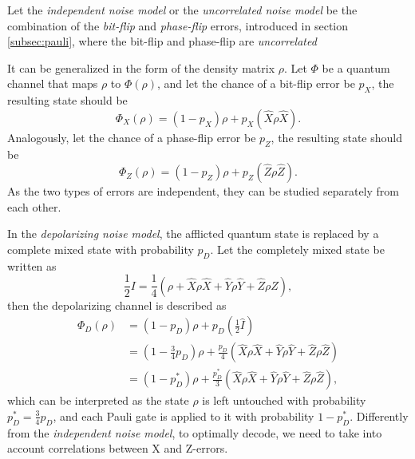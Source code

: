 \begin{definition}\label{def:independent}
  Let the \emph{independent noise model} or the \emph{uncorrelated noise model} be the combination of the \emph{bit-flip} and \emph{phase-flip} errors, introduced in section \ref{subsec:pauli}, where the bit-flip and phase-flip are \emph{uncorrelated}

  It can be generalized in the form of the density matrix $\rho$. Let $\Phi$ be a quantum channel that maps $\rho$ to $\Phi(\rho)$, and let the chance of a bit-flip error be $p_X$, the resulting state should be
  \begin{equation}\label{qec:eq:bitflip}
    \Phi_X(\rho) = (1-p_X)\rho + p_X(\hat{X}\rho \hat{X}).
  \end{equation}
  Analogously, let the chance of a phase-flip error be $p_Z$, the resulting state should be
  \begin{equation}\label{qec:eq:phaseflip}
    \Phi_Z(\rho) = (1-p_Z)\rho + p_Z(\hat{Z}\rho \hat{Z}).
  \end{equation}
  As the two types of errors are independent, they can be studied separately from each other.
\end{definition}

\begin{definition}\label{def:depolarizing}
  In the \emph{depolarizing noise model}, the afflicted quantum state is replaced by a complete mixed state with probability $p_D$. Let the completely mixed state be written as
  \begin{equation}\label{qec:eq:mixstate}
    \frac{1}{2}I = \frac{1}{4}(\rho + \hat{X}\rho \hat{X} + \hat{Y}\rho \hat{Y} + \hat{Z}\rho \hat{Z}),
  \end{equation}
  then the depolarizing channel is described as
  \begin{align}\label{qec:eq:depolarizing}
    \nonumber \Phi_D(\rho) &= (1-p_D)\rho + p_D\left(\frac{1}{2}\hat{I}\right) \\
    \nonumber &= \left(1-\frac{3}{4}p_D\right)\rho + \frac{p_D}{4}(\hat{X}\rho \hat{X} + \hat{Y}\rho \hat{Y} + \hat{Z}\rho \hat{Z}) \\
    &= (1-p^*_D)\rho + \frac{p^*_D}{3}(\hat{X}\rho \hat{X} + \hat{Y}\rho \hat{Y} + \hat{Z}\rho \hat{Z}),
  \end{align}
  which can be interpreted as the state $\rho$ is left untouched with probability $p^*_D =\frac{3}{4}p_D$, and each Pauli gate is applied to it with probability $1-p^*_D$. Differently from the \emph{independent noise model}, to optimally decode, we need to take into account correlations between X and Z-errors.
\end{definition}

